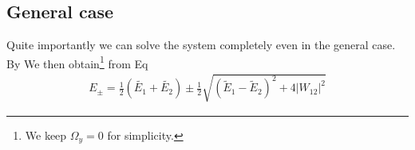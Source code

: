 \subsection{General case}

Quite importantly we can solve the system completely even in the general case. By We then obtain\footnote{We keep $\Omega_y =0$ for simplicity.} from Eq
\begin{align}\label{eq:Epm}
 E_\pm = \frac{1}{2}\left(\tilde{E_1}+\tilde{E_2}\right) \pm \frac{1}{2} \sqrt{\left(\tilde{E}_1-\tilde{E}_2\right)^2+4 \left|W_{12}\right|^2}
\end{align}
